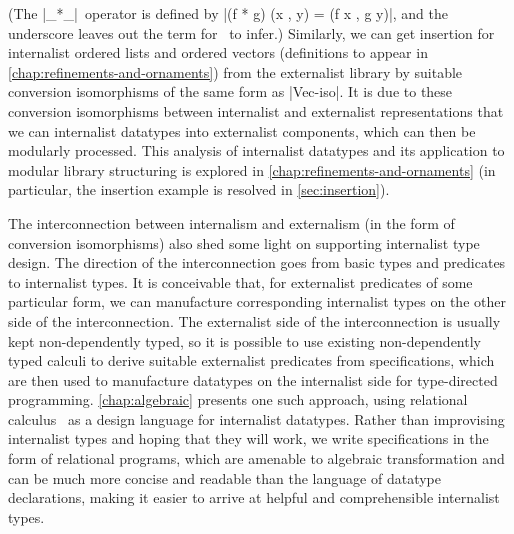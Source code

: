 \begin{center}
\end{center}
(The |_*_|~operator is defined by |(f * g) (x , y) = (f x , g y)|, and the underscore leaves out the term for \Agda\ to infer.)
Similarly, we can get insertion for internalist ordered lists and ordered vectors (definitions to appear in \autoref{chap:refinements-and-ornaments}) from the externalist library by suitable conversion isomorphisms of the same form as |Vec-iso|.
It is due to these conversion isomorphisms between internalist and externalist representations that we can  internalist datatypes into externalist components, which can then be modularly processed.
This analysis of internalist datatypes and its application to modular library structuring is explored in \autoref{chap:refinements-and-ornaments} (in particular, the insertion example is resolved in \autoref{sec:insertion}).

The interconnection between internalism and externalism (in the form of conversion isomorphisms) also shed some light on supporting internalist type design.
The  direction of the interconnection goes from basic types and predicates to internalist types.
It is conceivable that, for externalist predicates of some particular form, we can manufacture corresponding internalist types on the other side of the interconnection.
The externalist side of the interconnection is usually kept non-dependently typed, so it is possible to use existing non-dependently typed calculi to derive suitable externalist predicates from specifications, which are then used to manufacture datatypes on the internalist side for type-directed programming.
\autoref{chap:algebraic} presents one such approach, using relational calculus~\citep{Bird-AoP} as a design language for internalist datatypes.
Rather than improvising internalist types and hoping that they will work, we write specifications in the form of relational programs, which are amenable to algebraic transformation and can be much more concise and readable than the language of datatype declarations, making it easier to arrive at helpful and comprehensible internalist types.

